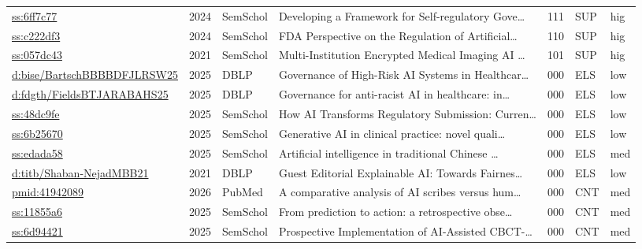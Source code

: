 \begin{table}[p]
\begin{tabularx}{\linewidth}{p{2.2cm} c p{1.4cm} X c p{1cm} p{0.7cm}}
  \href{https://www.semanticscholar.org/paper/6ff7c775b686fd1ade7b543b95e46a6edc43438a}{ss:6ff7c77} & 2024 & SemSchol & Developing a Framework for Self-regulatory Gove\ldots & 111 & SUP & hig \\
  \href{https://www.semanticscholar.org/paper/c222df39f6861098a33bb8b1ad86cee14c06074c}{ss:c222df3} & 2024 & SemSchol & FDA Perspective on the Regulation of Artificial\ldots & 110 & SUP & hig \\
  \href{https://www.semanticscholar.org/paper/057dc435313a999391271f9cf0ef46d1a5524c6e}{ss:057dc43} & 2021 & SemSchol & Multi-Institution Encrypted Medical Imaging AI \ldots & 101 & SUP & hig \\
  \href{https://dblp.org/rec/journals/bise/BartschBBBBDFJLRSW25}{d:bise/BartschBBBBDFJLRSW25} & 2025 & DBLP & Governance of High-Risk AI Systems in Healthcar\ldots & 000 & ELS & low \\
  \href{https://dblp.org/rec/journals/fdgth/FieldsBTJARABAHS25}{d:fdgth/FieldsBTJARABAHS25} & 2025 & DBLP & Governance for anti-racist AI in healthcare: in\ldots & 000 & ELS & low \\
  \href{https://www.semanticscholar.org/paper/48dc9fe86e888ae424eda1ac9ba85498699cef29}{ss:48dc9fe} & 2025 & SemSchol & How AI Transforms Regulatory Submission: Curren\ldots & 000 & ELS & low \\
  \href{https://www.semanticscholar.org/paper/6b256703d800a0757fb66b153dc1dfbff5b32dac}{ss:6b25670} & 2025 & SemSchol & Generative AI in clinical practice: novel quali\ldots & 000 & ELS & low \\
  \href{https://www.semanticscholar.org/paper/edada5869090472f36e36fa9ce9dc0b7c5fc8b00}{ss:edada58} & 2025 & SemSchol & Artificial intelligence in traditional Chinese \ldots & 000 & ELS & med \\
  \href{https://dblp.org/rec/journals/titb/Shaban-NejadMBB21}{d:titb/Shaban-NejadMBB21} & 2021 & DBLP & Guest Editorial Explainable AI: Towards Fairnes\ldots & 000 & ELS & low \\
  \href{https://pubmed.ncbi.nlm.nih.gov/41942089/}{pmid:41942089} & 2026 & PubMed & A comparative analysis of AI scribes versus hum\ldots & 000 & CNT & med \\
  \href{https://www.semanticscholar.org/paper/11855a6c39258799f3d5d87cd418b8cc43761e62}{ss:11855a6} & 2025 & SemSchol & From prediction to action: a retrospective obse\ldots & 000 & CNT & med \\
  \href{https://www.semanticscholar.org/paper/6d94421fcb97c68898b9761a5dcda0c007357105}{ss:6d94421} & 2025 & SemSchol & Prospective Implementation of AI-Assisted CBCT-\ldots & 000 & CNT & med \\

\end{tabularx}
\end{table}
